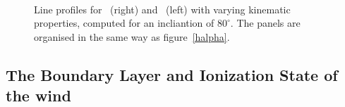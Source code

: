 \documentclass[preprint, a4paper, 11pt]{aastex}
\begin{document}


\begin{figure} %
\mbox{
\quad
{}   
}
\caption{
Line profiles for \heiiuv\ (right) and \heiiopt\  (left) with varying kinematic 
properties, computed for an incliantion of $80^\circ$. 
The panels are organised in the same way as figure~\ref{halpha}.
}
\label{heiifig}
\end{figure}



\subsection{The Boundary Layer and Ionization State of the wind}


\end{document}
